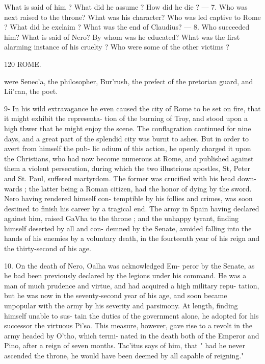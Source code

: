 \documentclass[openany,a4paper]{memoir}
\begin{document}
What is said of him ? What did he assume ? How did he die ? — 
7. Who was next raised to the throne? What was his character? 
Who was led captive to Rome ? What did he exclaim ? What was the 
end of Claudius? — 8. Who succeeded him? What is said of Nero? 
By whom was he educated? What was the first alarming instance of 
his cruelty ? Who were some of the other victims ? 



120 ROME. 

were Senec'a, the philosopher, Bur'rush, the prefect of the 
pretorian guard, and Lii'can, the poet. 

9- In his wild extravagance he even caused the city of 
Rome to be set on fire, that it might exhibit the representa- 
tion of the burning of Troy, and stood upon a high tbwer 
that he might enjoy the scene. The conflagration continued 
for nine days, and a great part of the splendid city was 
burnt to ashes. But in order to avert from himself the pub- 
lic odium of this action, he openly charged it upon the 
Christians, who had now become numerous at Rome, and 
published against them a violent persecution, during which 
the two illustrious apostles, St, Peter and St. Paul, suffered 
martyrdom. The former was crucified with his head down- 
wards ; the latter being a Roman citizen, had the honor of 
dying by the sword. Nero having rendered himself con- 
temptible by his follies and crimes, was soon destined to 
finish his career by a tragical end. The army in Spain having 
declared against him, raised GaVha to the throne ; and the 
unhappy tyrant, finding himself deserted by all and con- 
demned by the Senate, avoided falling into the hands of his 
enemies by a voluntary death, in the fourteenth year of his 
reign and the thirty-second of his age. 

10. On the death of Nero, Oalha was acknowledged Em- 
peror by the Senate, as he bad been previously declared by 
the legions under his command. He was a man of much 
prudence and virtue, and had acquired a high military repu- 
tation, but he was now in the seventy-second year of his age, 
and soon became unpopular with the army by his severity 
and parsimony. At length, finding himself unable to sus- 
tain the duties of the government alone, he adopted for his 
successor the virtuous Pi'so. This measure, however, gave 
rise to a revolt in the army headed by O'tho, which termi- 
nated in the death both of the Emperor and Pino, after a 
reign of seven months. Tac'itus says of him, that " had he 
never ascended the throne, he would have been deemed by 
all capable of reigning." 
\end{document}
